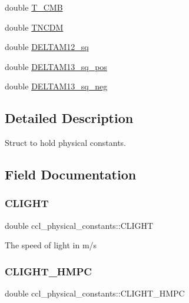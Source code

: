 \begin{DoxyCompactItemize}
double \mbox{\hyperlink{structccl__physical__constants_affc661a686b33da5e62b875d17a31a40}{T\+\_\+\+C\+MB}}
\item 
double \mbox{\hyperlink{structccl__physical__constants_af7fd71a73cc9bbbb18f9419a6c1ededd}{T\+N\+C\+DM}}
\item 
double \mbox{\hyperlink{structccl__physical__constants_a6a31be08c7a55dcc677fa56c4b05cf8b}{D\+E\+L\+T\+A\+M12\+\_\+sq}}
\item 
double \mbox{\hyperlink{structccl__physical__constants_a58b1796c3b7950f0db097bcf4a91d26e}{D\+E\+L\+T\+A\+M13\+\_\+sq\+\_\+pos}}
\item 
double \mbox{\hyperlink{structccl__physical__constants_afc0be44be16b5f3a9589f2d0f713e8d3}{D\+E\+L\+T\+A\+M13\+\_\+sq\+\_\+neg}}
\end{DoxyCompactItemize}


\subsection{Detailed Description}
Struct to hold physical constants. 

\subsection{Field Documentation}
\mbox{\label{structccl__physical__constants_a06e87731251b94440d38270a513ebac9}} 
\subsubsection{\texorpdfstring{C\+L\+I\+G\+HT}{CLIGHT}}
{\footnotesize\ttfamily double ccl\+\_\+physical\+\_\+constants\+::\+C\+L\+I\+G\+HT}

The speed of light in m/s \mbox{\label{structccl__physical__constants_ad3720957ff4700dc076030aafb2c6f22}} 
\subsubsection{\texorpdfstring{C\+L\+I\+G\+H\+T\+\_\+\+H\+M\+PC}{CLIGHT\_HMPC}}
{\footnotesize\ttfamily double ccl\+\_\+physical\+\_\+constants\+::\+C\+L\+I\+G\+H\+T\+\_\+\+H\+M\+PC}

